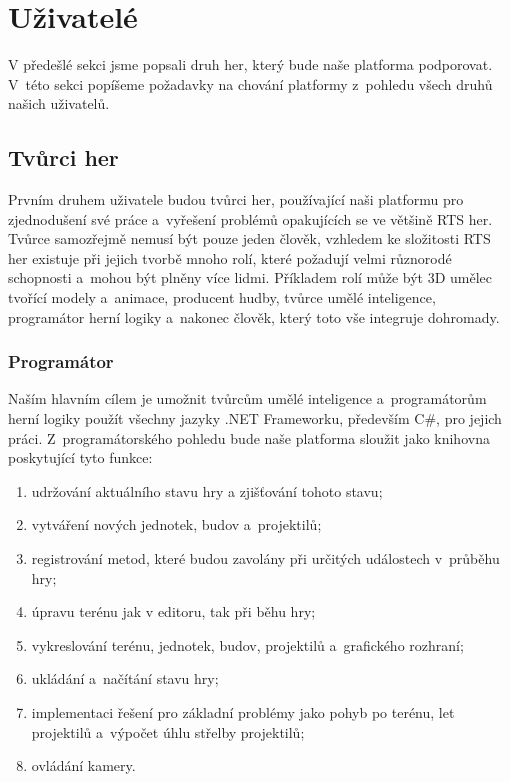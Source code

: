 \section{Uživatelé}
V předešlé sekci jsme popsali druh her, který bude naše platforma podporovat. V~této sekci popíšeme požadavky na chování platformy z~pohledu všech druhů našich uživatelů.

\subsection{Tvůrci her}
Prvním druhem uživatele budou tvůrci her, používající naši platformu pro zjednodušení své práce a~vyřešení problémů opakujících se ve většině RTS her. Tvůrce samozřejmě nemusí být pouze jeden člověk, vzhledem ke složitosti RTS her existuje při jejich tvorbě mnoho rolí, které požadují velmi různorodé schopnosti a~mohou být plněny více lidmi. Příkladem rolí může být 3D umělec tvořící modely a~animace, producent hudby, tvůrce umělé inteligence, programátor herní logiky a~nakonec člověk, který toto vše integruje dohromady.

\subsubsection{Programátor}
Naším hlavním cílem je umožnit tvůrcům umělé inteligence a~programátorům herní logiky použít všechny jazyky .NET Frameworku, především C\#, pro jejich práci. Z~programátorského pohledu bude naše platforma sloužit jako knihovna poskytující tyto funkce:

\begin{enumerate}
	\item udržování aktuálního stavu hry a zjišťování tohoto stavu;
	\item vytváření nových jednotek, budov a~projektilů;
	\item registrování metod, které budou zavolány při určitých událostech v~průběhu hry;
	\item úpravu terénu jak v editoru, tak při běhu hry;
	\item vykreslování terénu, jednotek, budov, projektilů a~grafického rozhraní;
	\item ukládání a~načítání stavu hry;
	\item implementaci řešení pro základní problémy jako pohyb po terénu, let projektilů a~výpočet úhlu střelby projektilů;
	\item ovládání kamery.
\end{enumerate}

